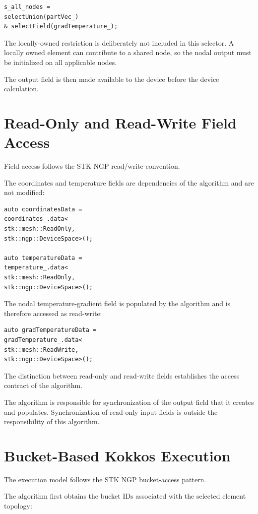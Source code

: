 \documentclass[11pt]{article}
\begin{document}
\begin{verbatim}
s_all_nodes =
selectUnion(partVec_)
& selectField(gradTemperature_);
\end{verbatim}

The locally-owned restriction is deliberately not included in this
selector.  A locally owned element can contribute to a shared node,
so the nodal output must be initialized on all applicable nodes.

The output field is then made available to the device before the
device calculation.

\section{Read-Only and Read-Write Field Access}

Field access follows the STK NGP read/write convention.

The coordinates and temperature fields are dependencies of the
algorithm and are not modified:

\begin{verbatim}
auto coordinatesData =
coordinates_.data<
stk::mesh::ReadOnly,
stk::ngp::DeviceSpace>();

auto temperatureData =
temperature_.data<
stk::mesh::ReadOnly,
stk::ngp::DeviceSpace>();
\end{verbatim}

The nodal temperature-gradient field is populated by the algorithm
and is therefore accessed as read-write:

\begin{verbatim}
auto gradTemperatureData =
gradTemperature_.data<
stk::mesh::ReadWrite,
stk::ngp::DeviceSpace>();
\end{verbatim}

The distinction between read-only and read-write fields establishes
the access contract of the algorithm.

The algorithm is responsible for synchronization of the output
field that it creates and populates.  Synchronization of read-only
input fields is outside the responsibility of this algorithm.

\section{Bucket-Based Kokkos Execution}

The execution model follows the STK NGP bucket-access pattern.

The algorithm first obtains the bucket IDs associated with the
selected element topology:
\end{document}
